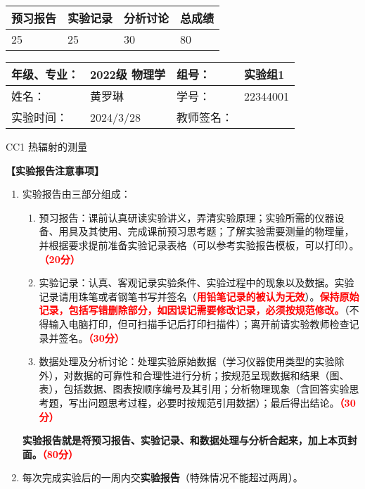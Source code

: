 \documentclass[dvipsnames, svgnames,a4paper,11pt]{article}
\begin{document}
	
	\begin{table}
		\renewcommand\arraystretch{1.7}
		\begin{tabularx}{\textwidth}{
				|X|X|X|X
				|X|X|X|X|}
			\hline
			\multicolumn{2}{|c|}{预习报告}&\multicolumn{2}{|c|}{实验记录}&\multicolumn{2}{|c|}{分析讨论}&\multicolumn{2}{|c|}{总成绩}\\
			\hline
			\LARGE25 & & \LARGE25 & & \LARGE30 & & \LARGE80 & \\
			\hline
		\end{tabularx}
	\end{table}
	
	\begin{table}
		\renewcommand\arraystretch{1.7}
		\begin{tabularx}{\textwidth}{|X|X|X|X|}
			\hline
			年级、专业： & 2022级 物理学 &组号： &实验组1 \\
			\hline
			姓名： &   黄罗琳 & 学号： &22344001   \\
			\hline
			实验时间： & 2024/3/28 & 教师签名： & \\
			\hline
		\end{tabularx}
	\end{table}
	
	\begin{center}
		\LARGE CC1 \quad 热辐射的测量

	\end{center}
	
	
	\textbf{【实验报告注意事项】}
	\begin{enumerate}
		\item 实验报告由三部分组成：
		\begin{enumerate}
			\item 预习报告：课前认真研读实验讲义，弄清实验原理；实验所需的仪器设备、用具及其使用、完成课前预习思考题；了解实验需要测量的物理量，并根据要求提前准备实验记录表格（可以参考实验报告模板，可以打印）。\textcolor{red}{\textbf{（20分）}}
			\item 实验记录：认真、客观记录实验条件、实验过程中的现象以及数据。实验记录请用珠笔或者钢笔书写并签名（\textcolor{red}{\textbf{用铅笔记录的被认为无效}}）。\textcolor{red}{\textbf{保持原始记录，包括写错删除部分，如因误记需要修改记录，必须按规范修改。}}（不得输入电脑打印，但可扫描手记后打印扫描件）；离开前请实验教师检查记录并签名。\textcolor{red}{\textbf{（30分）}}
			\item 数据处理及分析讨论：处理实验原始数据（学习仪器使用类型的实验除外），对数据的可靠性和合理性进行分析；按规范呈现数据和结果（图、表），包括数据、图表按顺序编号及其引用；分析物理现象（含回答实验思考题，写出问题思考过程，必要时按规范引用数据）；最后得出结论。\textcolor{red}{\textbf{（30分）}}
		\end{enumerate}
		\textbf{实验报告就是将预习报告、实验记录、和数据处理与分析合起来，加上本页封面。\textcolor{red}{（80分）}}
		\item 每次完成实验后的一周内交\textbf{实验报告}（特殊情况不能超过两周）。
	
	\end{enumerate}
	
\end{document}
